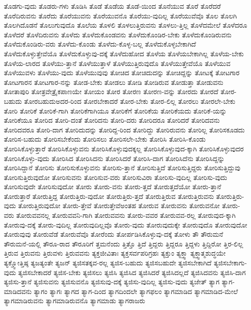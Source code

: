 {ತೊಡಗು-ವುದು
ತೊಡರು-ಗಳು
ತೊಡಿಸಿ
ತೊಡೆ
ತೊಡೆಯ
ತೊಡೆ-ಯಿಂದ
ತೊನೆಯುವ
ತೊರೆ
ತೊರೆದರೆ
ತೊರೆದಿರುವನು
ತೊರೆದು
ತೊರೆಯುವನು
ತೊರೆಯುವನೊ
ತೊರೆಯು-ವುದಿಲ್ಲ
ತೊರೆಯುವೆವೊ
ತೊಲ
ತೊಲಗಿ
ತೊಲಗಿದೊಡನೆ
ತೊಲುಗುವುದೊ
ತೊಲೆಯ
ತೊಳಲಿ
ತೊಳಲುತ್ತಿರುವನು
ತೊಳಲು-ತ್ತಿಲ್ಲ
ತೊಳೆದಮೇಲೆ
ತೊಳೆದರೂ
ತೊಳೆದರೆ
ತೊಳೆದಿರುವನು
ತೊಳೆದು
ತೊಳೆದುಕೊಂಡವನು
ತೊಳೆದುಕೊಂಡಿರ-ಬೇಕು
ತೊಳೆದುಕೊಂಡಿರುವನು
ತೊಳೆದುಕೊಂಡಿರು-ವರು
ತೊಳೆದು-ಕೊಂಡು
ತೊಳೆದು-ಕೊಳ್ಳ-ಬಲ್ಲ
ತೊಳೆದುಕೊಳ್ಳಬೇಕಾಗಿದೆ
ತೊಳೆದುಕೊಳ್ಳುತ್ತೇವೆಯೊ
ತೊಳೆದುಕೊಳ್ಳುವು-ದಕ್ಕೆ
ತೊಳೆದುಹೋದ
ತೊಳೆಯ
ತೊಳೆಯಬೇಕಾಗಿಲ್ಲ
ತೊಳೆಯ-ಬೇಕು
ತೊಳೆಯ-ಲಾರದ
ತೊಳೆಯು-ತ್ತಾನೆ
ತೊಳೆಯುತ್ತಾಳೆ
ತೊಳೆಯುತ್ತಿರುವುದೊ
ತೊಳೆಯುತ್ತೇವೆಯೊ
ತೊಳೆಯುವ
ತೊಳೆಯುವಳು
ತೊಳೆಯು-ವುದು
ತೊಳೆಯುವುವು
ತೋಚಿದ
ತೋಚಿದುದನ್ನು
ತೋಚಿದ್ದನ್ನು
ತೋಟಕ್ಕೆ
ತೋಟಗಾರ
ತೋಟಗಾರನ
ತೋಟಗಾರ-ನನ್ನು
ತೋಡ-ಬೇಕು
ತೋಡಲು
ತೋಡಿ
ತೋಡಿರುವ
ತೋಡುತ್ತಾ
ತೋಡುವನು
ತೋತಾಪುರಿ
ತೋತ್ರವೇತ್ರೈಕಪಾಣಯೇ
ತೋಯಂ
ತೋರ
ತೋರಣ
ತೋರಣ-ವನ್ನು
ತೋರದು
ತೋರದೆ
ತೋರ-ಬಹುದು
ತೋರಬಹುದುಅದರ-ರಿಂದ
ತೋರಬೇಕಾದರೆ
ತೋರ-ಬೇಕು
ತೋರ-ಲಿಲ್ಲ
ತೋರಲು
ತೋರಲೇ-ಬೇಕು
ತೋರಿ
ತೋರಿಕೆ
ತೋರಿಕೆ-ಗಾಗಿ
ತೋರಿಕೆಗಾಗಿಯೂ
ತೋರಿಕೆಗೆ
ತೋರಿಕೆಯ
ತೋರಿಕೆಯದು
ತೋರಿಕೆ-ಯನ್ನು
ತೋರಿಕೆಯೂ
ತೋರಿದ
ತೋರಿ-ದಂತೆ
ತೋರಿದನು
ತೋರಿ-ದರು
ತೋರಿದರೂ
ತೋರಿದರೆ
ತೋರಿದವನು
ತೋರಿದವರೂ
ತೋರಿ-ದಾಗ
ತೋರಿದುದನ್ನು
ತೋರಿದ್ದ-ರಿಂದ
ತೋರಿದ್ದು
ತೋರಿರುವನು
ತೋರಿಲ್ಲ
ತೋರಿಸಕೂಡದು
ತೋರಿಸ-ಬಹುದು
ತೋರಿಸಬೇಕೆಂದು
ತೋರಿಸಲು
ತೋರಿಸಲೇ-ಬೇಕು
ತೋರಿಸಿ
ತೋರಿಸಿ-ಕೊಂಡು
ತೋರಿಸಿಕೊಳ್ಳುತ್ತಾರೆ
ತೋರಿಸಿಕೊಳ್ಳುವನು
ತೋರಿಸಿಕೊಳ್ಳುವುದಕ್ಕಲ್ಲ
ತೋರಿಸಿಕೊಳ್ಳುವುದ-ಕ್ಕಾಗಿ
ತೋರಿಸಿಕೊಳ್ಳುವುದರ
ತೋರಿಸಿಕೊಳ್ಳು-ವುದು
ತೋರಿಸಿದ
ತೋರಿಸಿದನು
ತೋರಿಸಿದರೆ
ತೋರಿಸಿ-ದಾಗ
ತೋರಿಸಿದೆನು
ತೋರಿಸಿದ್ದನ್ನು
ತೋರಿಸಿದ್ದಾನೆ
ತೋರಿಸು
ತೋರಿಸುಕೊಳ್ಳುವನು
ತೋರಿಸು-ತ್ತಾನೆ
ತೋರಿಸುತ್ತಿದೆ
ತೋರಿಸುತ್ತಿದ್ದರು
ತೋರಿಸುತ್ತಿದ್ದುವು
ತೋರಿಸುತ್ತಿರುವುದೋ
ತೋರಿಸುವನು
ತೋರಿಸುವ-ವರು
ತೋರಿಸುವಿರಾ
ತೋರಿಸು-ವುದಿಲ್ಲ
ತೋರಿಸು-ವುದು
ತೋರಿಸುವುದೇ
ತೋರಿಸುವುದೋ
ತೋರು
ತೋರು-ವನು
ತೋರು-ತ್ತದೆ
ತೋರುತ್ತದೆಯೋ
ತೋರು-ತ್ತಾನೆ
ತೋರುತ್ತಾರೆ
ತೋರುತ್ತಿದ್ದ
ತೋರುತ್ತಿರು-ವುದೋ
ತೋರುತ್ತಿರು-ತ್ತದೆ
ತೋರುತ್ತಿರುವ
ತೋರುತ್ತಿರುವನು
ತೋರುತ್ತಿರು-ವುದು
ತೋರುತ್ತಿರುವುದೋ
ತೋರು-ತ್ತೇವೆ
ತೋರುತ್ತೇವೆಅಂತಹ
ತೋರುವ
ತೋರುವನು
ತೋರುವನೋ
ತೋರು-ವರು
ತೋರುವವನಲ್ಲ
ತೋರುವವನಿ-ಗಾಗಿ
ತೋರುವವನು
ತೋರು-ವವರ
ತೋರುವವ-ರಲ್ಲ
ತೋರುವುದ-ಕ್ಕಾಗಿ
ತೋರುವು-ದಕ್ಕೆ
ತೋರು-ವುದಿಲ್ಲ
ತೋರುವುದಿಲ್ಲವೊ
ತೋರು-ವುದು
ತೋರುವುದುಕ್ಕೇ
ತೋರುವುದೊ
ತೋರುವುದೋ
ತೋರುವುವು
ತೋರುವೆಡೆ
ತೋರುವೆವೊ
ತೋರೆಂದು
ತೋರ್ಪಡಿಸಿಕೊಳ್ಳುವು-ದಕ್ಕೆ
ತೋಳು
ತೌ
ತೌರುಮನೆ
ತೌರುಮನೆ-ಯಲ್ಲಿ
ತೌರೂ-ರಾದ
ತೌರೂರಿಗೆ
ತ್ತಮನೆಂದು
ತ್ತಿತ್ತೊ
ತ್ತಿದೆ
ತ್ತಿದ್ದರು
ತ್ತಿದ್ದರೂ
ತ್ತಿದ್ದಳು
ತ್ತಿದ್ದಿರೋ
ತ್ತಿರ-ಲಿಲ್ಲ
ತ್ತಿರುವ
ತ್ತಿರುವನು
ತ್ತಿರುವಳು
ತ್ತಿರುವವನು
ತ್ಯಕ್ತಜೀವಿತಾಃ
ತ್ಯಕ್ತಸರ್ವಪರಿಗ್ರಹಃ
ತ್ಯಕ್ತುಂ
ತ್ಯಕ್ತ್ವಾ
ತ್ಯಕ್ತ್ವಾತ್ಮಶುದ್ಧಯೇ
ತ್ಯಕ್ತ್ವೋತ್ತಿಷ್ಠ
ತ್ಯಜತ್ಯಂತೇ
ತ್ಯಜನ್
ತ್ಯಜಿಸತಕ್ಕವ-ರಲ್ಲ
ತ್ಯಜಿಸ-ಬಹುದು
ತ್ಯಜಿಸಬಹುದೇ
ತ್ಯಜಿಸಬೇಕಾಗಿದೆ
ತ್ಯಜಿಸಬೇಕಾಗು-ವುದು
ತ್ಯಜಿಸಬೇಕಾದರೆ
ತ್ಯಜಿಸ-ಬೇಕು
ತ್ಯಜಿಸಲು
ತ್ಯಜಿಸಿ
ತ್ಯಜಿಸಿದ
ತ್ಯಜಿಸಿದರೆ
ತ್ಯಜಿಸಿದಲ್ಲದೆ
ತ್ಯಜಿಸಿದವನು
ತ್ಯಜಿಸಿ-ದಾಗ
ತ್ಯಜಿಸು-ತ್ತಾನೆ
ತ್ಯಜಿಸುವನು
ತ್ಯಜಿಸುವನೊ
ತ್ಯಜಿಸುವು-ದಕ್ಕೆ
ತ್ಯಜಿಸು-ವುದಿಲ್ಲ
ತ್ಯಜಿಸು-ವುದು
ತ್ಯಜೇತ್
ತ್ಯಾಗ
ತ್ಯಾಗ-ಮಾಡಿದವನು
ತ್ಯಾಗಂ
ತ್ಯಾಗಃ
ತ್ಯಾಗದ
ತ್ಯಾಗ-ದಿಂದ
ತ್ಯಾಗದಿಂದಲೇ
ತ್ಯಾಗಫಲಂ
ತ್ಯಾಗಮಾಡಿದ
ತ್ಯಾಗಮಾಡಿದ-ಮೇಲೆ
ತ್ಯಾಗಮಾಡಿರುವನು
ತ್ಯಾಗಮಾಡಿರುವನೊ
ತ್ಯಾಗಮಾಡು
ತ್ಯಾಗರಾಜರು
}
